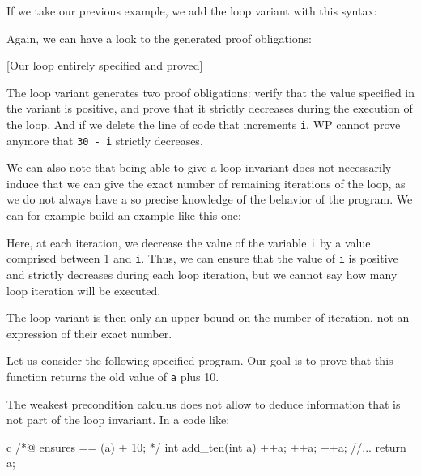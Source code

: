 If we take our previous example, we add the loop variant with this
syntax:






Again, we can have a look to the generated proof obligations:



[Our loop entirely specified and proved]


The loop variant generates two proof obligations: verify that the value
specified in the variant is positive, and prove that it strictly
decreases during the execution of the loop. And if we delete the line of
code that increments \texttt{i}, WP cannot prove anymore that
\texttt{30\ -\ i} strictly decreases.

We can also note that being able to give a loop invariant does not
necessarily induce that we can give the exact number of remaining
iterations of the loop, as we do not always have a so precise knowledge
of the behavior of the program. We can for example build an example like
this one:






Here, at each iteration, we decrease the value of the variable
\texttt{i} by a value comprised between 1 and \texttt{i}. Thus, we can
ensure that the value of \texttt{i} is positive and strictly decreases
during each loop iteration, but we cannot say how many loop iteration
will be executed.



The loop variant is then only an upper bound on the number of iteration,
not an expression of their exact number.





Let us consider the following specified program. Our goal is to prove
that this function returns the old value of \texttt{a} plus 10.






The weakest precondition calculus does not allow to deduce information
that is not part of the loop invariant. In a code like:



\begin{CodeBlock}{c}
/*@
    ensures \result == \old(a) + 10;
*/
int add_ten(int a){
    ++a;
    ++a;
    ++a;
    //...
    return a;
}
\end{CodeBlock}


